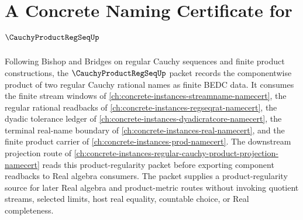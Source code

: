 \chapter{A Concrete Naming Certificate for $\CauchyProductRegSeqUp$}
\label{ch:concrete-instances-cauchy-product-regseq-namecert}

Following Bishop and Bridges on regular Cauchy sequences and finite product constructions, the $\CauchyProductRegSeqUp$ packet records the componentwise product of two regular Cauchy rational names as finite BEDC data. It consumes the finite stream windows of \autoref{ch:concrete-instances-streamname-namecert}, the regular rational readbacks of \autoref{ch:concrete-instances-regseqrat-namecert}, the dyadic tolerance ledger of \autoref{ch:concrete-instances-dyadicratcore-namecert}, the terminal real-name boundary of \autoref{ch:concrete-instances-real-namecert}, and the finite product carrier of \autoref{ch:concrete-instances-prod-namecert}. The downstream projection route of \autoref{ch:concrete-instances-regular-cauchy-product-projection-namecert} reads this product-regularity packet before exporting component readbacks to Real algebra consumers. The packet supplies a product-regularity source for later Real algebra and product-metric routes without invoking quotient streams, selected limits, host real equality, countable choice, or Real completeness.

